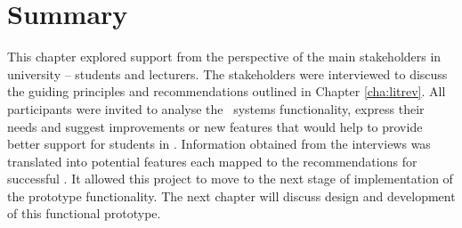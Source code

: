 \section{Summary}

This chapter explored \LLLs support from the perspective of the main
stakeholders in university -- students and lecturers. The stakeholders were
interviewed to discuss the guiding principles and recommendations outlined in
Chapter \ref{cha:litrev}. All participants were invited to analyse the
\ep~systems functionality, express their needs and suggest improvements or new
features that would help to provide better support for students in \LLLsn.
Information obtained from the interviews was translated into potential features
each mapped to the recommendations for successful \LLLsn. It allowed this
project to move to the next stage of implementation of the prototype
functionality. The next chapter will discuss design and development of this
functional prototype.
